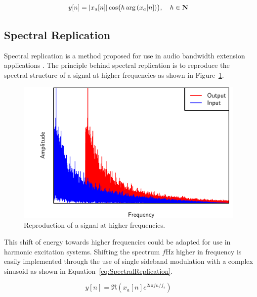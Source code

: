 		\begin{equation}
			y[n] = \left|x_{a}[n]\right| \cos \bigl( h\arg \left( x_{a}[n] \right) \bigr), \quad h \in \textbf{N}
			\label{eq:IAP}
		\end{equation}

	\subsection{Spectral Replication}
	\label{sec:Excitation-Methods-SpectralReplication}
		Spectral replication is a method proposed for use in audio bandwidth extension applications
		\citep{nagel2010a}. The principle behind spectral replication is to reproduce the spectral structure of a
		signal at higher frequencies as shown in Figure~\ref{fig:SpectralReplication}.

		\begin{figure}[h!]
			\centering
			\includegraphics{chapter3/Images/SpectralReplicationSpectrum.pdf}
			\caption{Reproduction of a signal at higher frequencies.}
			\label{fig:SpectralReplication}
		\end{figure}

		This shift of energy towards higher frequencies could be adapted for use in harmonic excitation systems.
		Shifting the spectrum $f$Hz higher in frequency is easily implemented through the use of single sideband
		modulation with a complex sinusoid as shown in Equation~\ref{eq:SpectralReplication}.

		\begin{equation}
			y[n] = \Re \left( x_{a}[n] e^{2i\pi fn/ f_{s}} \right)
			\label{eq:SpectralReplication}
		\end{equation}

